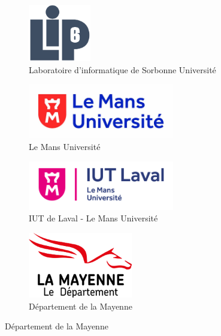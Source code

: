 \begin{figure}[!ht]
	\begin{subfigure}{0.4\textwidth}
            \centering
		\includegraphics[width=0.3\textwidth]{Content/figures/logo_LIP6.png}
		\caption{Laboratoire d'informatique de Sorbonne Université}
	\end{subfigure}
	\hfill
	\begin{subfigure}{0.4\textwidth}
            \centering
		\includegraphics[width=0.7\textwidth]{Content/figures/lemans_logo.jpg}
		\caption{Le Mans Université}
	\end{subfigure}
	
	\vspace{0.08\textheight}
	
	\begin{subfigure}{0.4\textwidth}
            \centering
		\includegraphics[width=0.7\textwidth]{Content/figures/logo_iut.png}
		\caption{IUT de Laval - Le Mans Université}
	\end{subfigure}
	\hfill
	\begin{subfigure}{0.4\textwidth}
            \centering
		\includegraphics[width=0.5\textwidth]{Content/figures/mayenne_logo.png}
		\caption{Département de la Mayenne}
	\end{subfigure}
\end{figure}